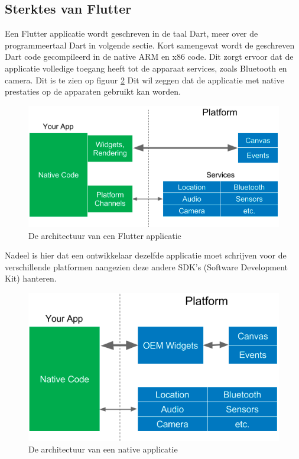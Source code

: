 \subsection{Sterktes van Flutter}
Een Flutter applicatie wordt geschreven in de taal Dart, meer over de programmeertaal Dart in volgende sectie. Kort samengevat wordt de geschreven Dart code gecompileerd in de native ARM en x86 code. 
Dit zorgt ervoor dat de applicatie volledige toegang heeft tot de apparaat services, zoals Bluetooth en camera. Dit is te zien op figuur \ref{fig:flutter-app-architecture}
Dit wil zeggen dat de applicatie met native prestaties op de apparaten gebruikt kan worden.


\begin{figure}[H]
    \centering
    \includegraphics[width=\figureWidthModifier\linewidth]{img/stand-van-zaken/flutter-app-architecture.png}
    \caption{De architectuur van een Flutter applicatie}
    \label{fig:flutter-app-architecture}
\end{figure}

Nadeel is hier dat een ontwikkelaar dezelfde applicatie moet schrijven voor de verschillende platformen aangezien deze andere SDK's (Software Development Kit) hanteren. \autocite{Coninck2019}
\begin{figure}[H]
    \centering
    \includegraphics[width=\figureWidthModifier\linewidth]{img/stand-van-zaken/native-app-architecture.png}
    \caption{De architectuur van een native applicatie}
    \label{fig:flutter-app-architecture}
\end{figure}

